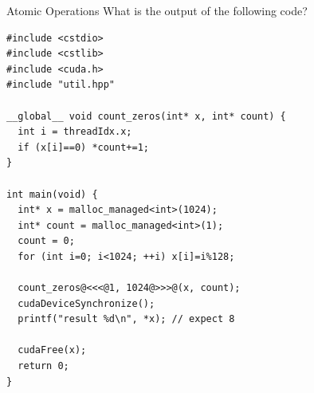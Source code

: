 \documentclass[aspectratio=43]{beamer}
\begin{document}
\begin{frame}[fragile]{Atomic Operations}
    What is the output of the following code?
    \begin{code}{}
        \begin{lstlisting}[style=boxcudatiny]
#include <cstdio>
#include <cstlib>
#include <cuda.h>
#include "util.hpp"

__global__ void count_zeros(int* x, int* count) {
  int i = threadIdx.x;
  if (x[i]==0) *count+=1;
}

int main(void) {
  int* x = malloc_managed<int>(1024);
  int* count = malloc_managed<int>(1);
  count = 0;
  for (int i=0; i<1024; ++i) x[i]=i%128;

  count_zeros@<<<@1, 1024@>>>@(x, count);
  cudaDeviceSynchronize();
  printf("result %d\n", *x); // expect 8

  cudaFree(x);
  return 0;
}
        \end{lstlisting}
    \end{code}

\end{frame}
\end{document}
